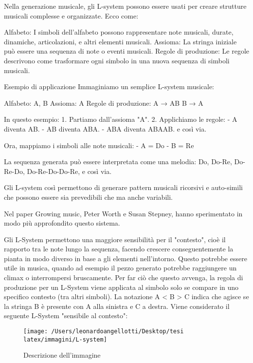 \documentclass[a4paper,12pt]{report}
\begin{document}
Nella generazione musicale, gli L-system possono essere usati per creare strutture musicali complesse e organizzate. Ecco come:

Alfabeto: I simboli dell'alfabeto possono rappresentare note musicali, durate, dinamiche, articolazioni, e altri elementi musicali.
Assioma: La stringa iniziale può essere una sequenza di note o eventi musicali.
Regole di produzione: Le regole descrivono come trasformare ogni simbolo in una nuova sequenza di simboli musicali.

Esempio di applicazione
Immaginiamo un semplice L-system musicale:

Alfabeto: {A, B}
Assioma: A
Regole di produzione: 
  A → AB
  B → A

In questo esempio:
1. Partiamo dall'assioma "A".
2. Applichiamo le regole:
   - A diventa AB.
   - AB diventa ABA.
   - ABA diventa ABAAB.
   e così via.

Ora, mappiamo i simboli alle note musicali:
- A = Do
- B = Re

La sequenza generata può essere interpretata come una melodia: Do, Do-Re, Do-Re-Do, Do-Re-Do-Do-Re, e così via.

Gli L-system così permettono di generare pattern musicali ricorsivi e auto-simili che possono essere sia prevedibili che ma anche variabili. 

Nel paper Growing music, Peter Worth e Susan Stepney, hanno sperimentato in modo più approfondito questo sistema.

Gli L-System permettono una maggiore sensibilità per il "contesto", cioè il rapporto tra le note lungo la sequenza, 
facendo crescere conseguentemente la pianta in modo diverso in base a gli elementi nell'intorno.
Questo potrebbe essere utile in musica, quando ad esempio il pezzo generato potrebbe raggiungere un climax o interrompersi bruscamente. 
Per far ciò che questo avvenga, la regola di produzione per un L-System viene applicata al simbolo solo se compare in uno specifico
contesto (tra altri simboli). 
La notazione A < B > C indica che agisce se la stringa B è presente con A alla sinistra e C a destra.
Viene considerato il seguente L-System "sensibile al contesto":

\begin{figure}[h!]
    \centering
    \texttt{[image: /Users/leonardoangellotti/Desktop/tesi latex/immagini/L-system]} 
    \caption{Descrizione dell'immagine}
    \label{fig:immagine}
\end{figure}
\end{document}
